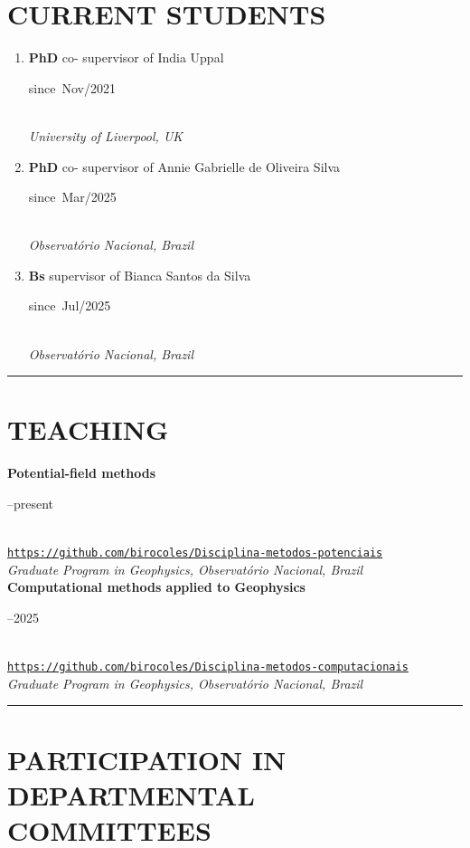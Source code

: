\documentclass[11pt,a4paper,onecolumn]{article}
\newcommand{\Student}[5]{
	\noindent \textbf{#1} #2 supervisor of #3 \hfill 
	\parbox{0.1\textwidth}{\raggedleft since~#4} \\
	\noindent\textsl{#5}}
\begin{document}
\section*{CURRENT STUDENTS}

\begin{enumerate}[leftmargin=*, label=\textbf{(\arabic*)}]
	
	\item\Student{PhD}{co-}{India Uppal}{Nov/2021}{University of Liverpool, UK}
	
	\item\Student{PhD}{co-}{Annie Gabrielle de Oliveira Silva}{Mar/2025}{Observat{\' o}rio Nacional, Brazil}
	
	\item\Student{Bs}{}{Bianca Santos da Silva}{Jul/2025}{Observat{\' o}rio Nacional, Brazil}

	
\end{enumerate}

\bigskip \hrule

\section*{TEACHING}{}

\noindent \textbf{Potential-field methods} \hfill 
\parbox{0.1\textwidth}{--present} \\
\noindent\href{https://github.com/birocoles/Disciplina-metodos-potenciais}
{\texttt{https://github.com/birocoles/Disciplina-metodos-potenciais}} \\
\noindent\textsl{Graduate Program in Geophysics, Observat\'{o}rio Nacional, Brazil} \vspace{0.5\baselineskip} \\
\noindent \textbf{Computational methods applied to Geophysics} \hfill
\parbox{0.1\textwidth}{--2025} \\
\noindent\href{https://github.com/birocoles/Disciplina-metodos-computacionais}
{\texttt{https://github.com/birocoles/Disciplina-metodos-computacionais}} \\
\noindent\textsl{Graduate Program in Geophysics, Observat\'{o}rio Nacional, Brazil} \\

\bigskip \hrule

\section*{PARTICIPATION IN DEPARTMENTAL COMMITTEES}{}
\end{document}
